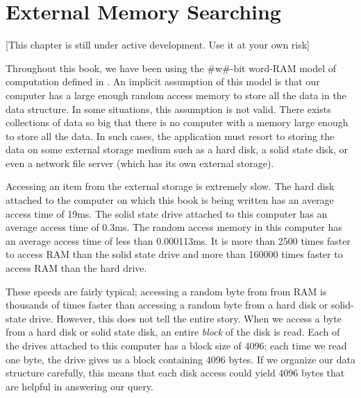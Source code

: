\chapter{External Memory Searching}

[This chapter is still under active development.  Use it at your own risk]

Throughout this book, we have been using the #w#-bit word-RAM model
of computation defined in .   An implicit assumption of
this model is that our computer has a large enough random access memory
to store all the data in the data structure.  In some situations, this
assumption is not valid.  There exists collections of data so big that
there is no computer with a memory large enough to store all the data.
In such cases, the application must resort to storing the data on some
external storage medium such as a hard disk, a solid state disk, or even
a network file server (which has its own external storage).

Accessing an item from the external storage is extremely slow.  The hard
disk attached to the computer on which this book is being written has
an average access time of 19ms.  The solid state drive attached to this
computer has an average access time of 0.3ms.  The random access memory in
this computer has an average access time of less than 0.000113ms.  It is
more than 2500 times faster to access RAM than the solid state drive
and more than 160000 times faster to access RAM than the hard drive.

% 
% 
% 

These speeds are fairly typical;  accessing a random byte from from RAM
is thousands of times faster than accessing a random byte from a hard
disk or solid-state drive.  However, this does not tell the entire story.
When we access a byte from a hard disk or solid state disk, an entire
\emph{block} of the disk is read.  Each of the drives attached to
this computer has a block size of 4096; each time we read one byte,
the drive gives us a block containing 4096 bytes.  If we organize our
data structure carefully, this means that each disk access could yield
4096 bytes that are helpful in answering our query.

